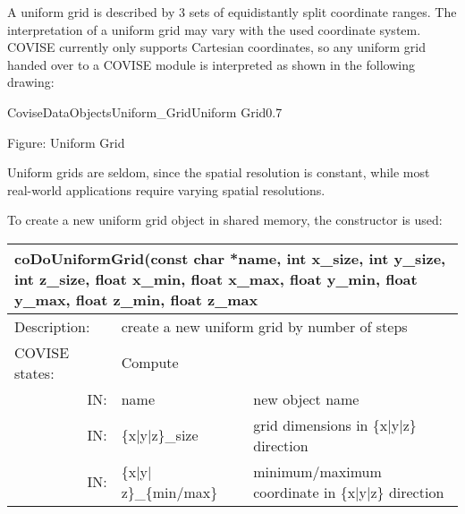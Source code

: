 A uniform grid is described by 3 sets of equidistantly split coordinate ranges. 
The interpretation of a uniform grid may vary with the used coordinate
system. COVISE currently only supports Cartesian coordinates, so any uniform 
grid handed over to a COVISE module is interpreted as shown in the
following drawing: 
\latexonly

\endlatexonly

\begin{covimg}{CoviseDataObjects}{Uniform_Grid}{Uniform Grid}{0.7}\end{covimg}
\begin{htmlonly}
Figure: Uniform Grid
\end{htmlonly}
\vspace*{1cm}

Uniform grids are seldom, since the spatial resolution is constant, while most 
real-world applications require varying spatial resolutions. 

To create a new uniform grid object in shared memory, the 
constructor is used:

\latexonly
\begin{longtable}{|p{4cm}|p{2.5cm}|p{7cm}|}
\hline
\multicolumn{3}{|p{13.5cm}|}{\bf coDoUniformGrid(const char *name,\newline
           int     x\_size,  int     y\_size,  int     z\_size,\newline
	   float  x\_min,    float   x\_max,   float  y\_min,\newline
	   float  y\_max,    float   z\_min,   float  z\_max }\\
\hline
{Description:}  
       & \multicolumn{2}{p{9.5cm}|}{create a new uniform grid by number of steps} \\
\hline
{COVISE states:}  
           & \multicolumn{2}{p{9.5cm}|}{Compute} \\
\hline
\multicolumn{1}{|r|}{IN:} & \multicolumn{1}{p{3cm}|}{name} 
                          & \multicolumn{1}{p{5cm}|}{new object name}\\
\hline
\multicolumn{1}{|r|}{IN:} & \multicolumn{1}{p{3cm}|}{\{x$\mid$y$\mid$z\}\_size} 
                          & \multicolumn{1}{p{5cm}|}{grid dimensions\newline 
			  in \{x$\mid$y$\mid$z\} direction}\\
\hline
\multicolumn{1}{|r|}{IN:} & \multicolumn{1}{p{3cm}|}{\{x$\mid$y$\mid$z\}\_\{min/max\}} 
                          & \multicolumn{1}{p{5cm}|}{minimum/maximum coordinate 
			  in \{x$\mid$y$\mid$z\} direction}\endhead
\hline
\end{longtable}
\endlatexonly

